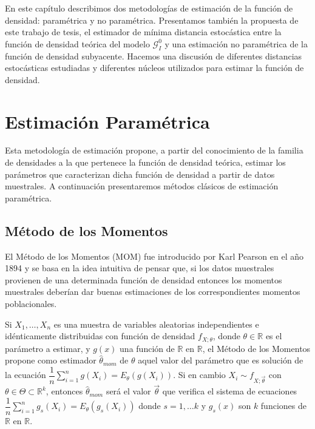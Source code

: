 En este capítulo describimos dos metodologías de estimación de la función de densidad: paramétrica y no paramétrica. Presentamos también la propuesta de este trabajo de tesis, el estimador de mínima distancia estocástica entre la función de densidad teórica del modelo $\mathcal{G}_I^0$ y una estimación no paramétrica de la función de densidad subyacente. Hacemos una discusión de diferentes distancias estocásticas estudiadas y diferentes núcleos utilizados para estimar la función de densidad.


\section{Estimación Paramétrica}

Esta metodología de estimación propone, a partir del conocimiento de la familia de densidades a la que pertenece la función de densidad teórica, estimar los parámetros que caracterizan dicha función de densidad a partir de datos muestrales. A continuación presentaremos métodos clásicos de estimación paramétrica.

\subsection{Método de los Momentos}
El Método de los Momentos (MOM) fue introducido por Karl Pearson en el año 1894 y se basa en la idea intuitiva de pensar que, si los datos muestrales provienen de una determinada función de densidad entonces los momentos muestrales deberían dar buenas estimaciones de los correspondientes momentos poblacionales. 

\begin{definition}
Si $X_1, \ldots, X_n$ es una muestra de variables aleatorias independientes e idénticamente distribuidas con función de densidad $f_{X;\theta}$, donde $\theta \in \mathbb{R}$ es el parámetro a estimar, y $g(x)$ una función de $\mathbb{R}$ en $\mathbb{R}$, el Método de los Momentos propone como estimador $\hat{\theta}_{mom}$ de $\theta$ aquel valor del parámetro que es solución de la ecuación  $\dfrac{1}{n} \sum_{i=1}^n g(X_i)=E_{\theta}(g(X_i)).$  
Si en cambio $X_i \sim f_{X;\vec{\theta}}$ con $\theta \in \Theta \subset \mathbb{R}^k$, entonces $\hat{\theta}_{mom}$ será el valor $\vec{\theta}$ que verifica el sistema de ecuaciones $\dfrac{1}{n} \sum_{i=1}^n g_s(X_i)=E_{\theta}(g_s(X_i))$ donde $s=1, \ldots k$ y $g_s(x)$ son $k$ funciones de $\mathbb{R}$ en $\mathbb{R}$.
\end{definition}


